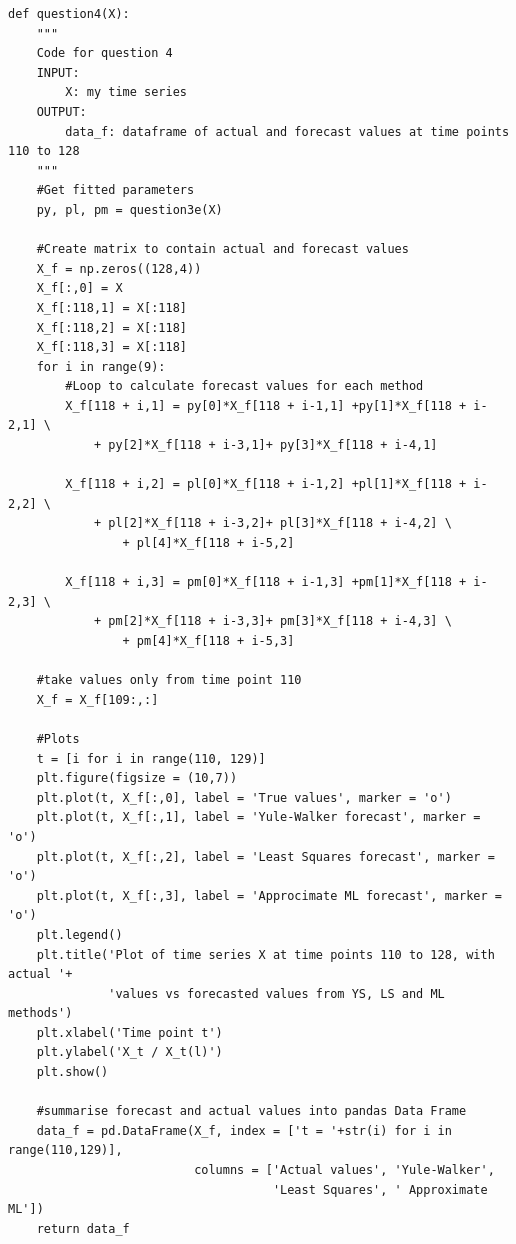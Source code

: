 \documentclass[a4paper,10pt]{article}
\theoremstyle{mytheor}
\begin{document}
\begin{lstlisting}
def question4(X):
    """
    Code for question 4
    INPUT:
        X: my time series
    OUTPUT:
        data_f: dataframe of actual and forecast values at time points 110 to 128
    """
    #Get fitted parameters
    py, pl, pm = question3e(X)
    
    #Create matrix to contain actual and forecast values
    X_f = np.zeros((128,4))
    X_f[:,0] = X
    X_f[:118,1] = X[:118]
    X_f[:118,2] = X[:118]
    X_f[:118,3] = X[:118]
    for i in range(9):
        #Loop to calculate forecast values for each method
        X_f[118 + i,1] = py[0]*X_f[118 + i-1,1] +py[1]*X_f[118 + i-2,1] \
            + py[2]*X_f[118 + i-3,1]+ py[3]*X_f[118 + i-4,1]
            
        X_f[118 + i,2] = pl[0]*X_f[118 + i-1,2] +pl[1]*X_f[118 + i-2,2] \
            + pl[2]*X_f[118 + i-3,2]+ pl[3]*X_f[118 + i-4,2] \
                + pl[4]*X_f[118 + i-5,2]
            
        X_f[118 + i,3] = pm[0]*X_f[118 + i-1,3] +pm[1]*X_f[118 + i-2,3] \
            + pm[2]*X_f[118 + i-3,3]+ pm[3]*X_f[118 + i-4,3] \
                + pm[4]*X_f[118 + i-5,3]
                
    #take values only from time point 110
    X_f = X_f[109:,:]
    
    #Plots
    t = [i for i in range(110, 129)]
    plt.figure(figsize = (10,7))
    plt.plot(t, X_f[:,0], label = 'True values', marker = 'o')
    plt.plot(t, X_f[:,1], label = 'Yule-Walker forecast', marker = 'o')
    plt.plot(t, X_f[:,2], label = 'Least Squares forecast', marker = 'o')
    plt.plot(t, X_f[:,3], label = 'Approcimate ML forecast', marker = 'o')
    plt.legend()
    plt.title('Plot of time series X at time points 110 to 128, with actual '+
              'values vs forecasted values from YS, LS and ML methods')
    plt.xlabel('Time point t')
    plt.ylabel('X_t / X_t(l)')
    plt.show()
    
    #summarise forecast and actual values into pandas Data Frame
    data_f = pd.DataFrame(X_f, index = ['t = '+str(i) for i in range(110,129)],
                          columns = ['Actual values', 'Yule-Walker', 
                                     'Least Squares', ' Approximate ML'])
    return data_f
\end{lstlisting}
\end{document}
